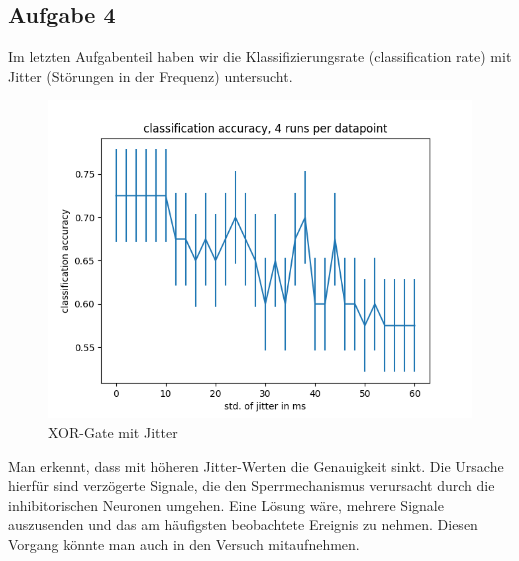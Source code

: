 \documentclass[10pt,a4paper]{scrartcl}
\begin{document}
\subsection{Aufgabe 4}
Im letzten Aufgabenteil haben wir die Klassifizierungsrate (classification rate) mit Jitter (Störungen in der Frequenz) untersucht.

\begin{figure} [ht]
\begin{center}
\label{fig:abb43}
\caption{XOR-Gate mit Jitter}
\includegraphics[scale=0.45]{pictures/jitter_plot_lang.png}
\end{center}
\end{figure}

\noindent Man erkennt, dass mit höheren Jitter-Werten die Genauigkeit sinkt. Die Ursache hierfür sind verzögerte Signale, die den Sperrmechanismus verursacht durch die inhibitorischen Neuronen umgehen. Eine Lösung wäre, mehrere Signale auszusenden und das am häufigsten beobachtete Ereignis zu nehmen. Diesen Vorgang könnte man auch in den Versuch mitaufnehmen.
\end{document}

